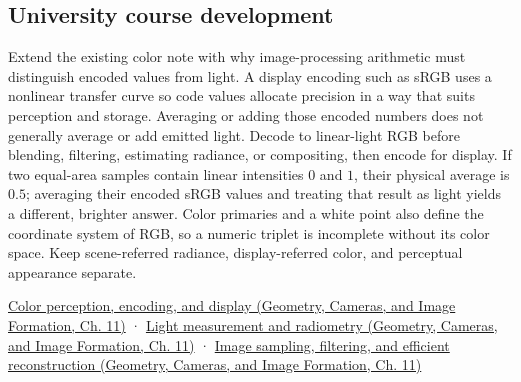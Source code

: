 \subsection{University course development}\label{appendix-a9f83ad40792-university-course-development}

\hypertarget{appendix-a9f83ad40792-university-course-development}{}

Extend the existing color note with why image-processing arithmetic must distinguish encoded values from light. A display encoding such as sRGB uses a nonlinear transfer curve so code values allocate precision in a way that suits perception and storage. Averaging or adding those encoded numbers does not generally average or add emitted light. Decode to linear-light RGB before blending, filtering, estimating radiance, or compositing, then encode for display. If two equal-area samples contain linear intensities \(0\) and \(1\), their physical average is \(0.5\); averaging their encoded sRGB values and treating that result as light yields a different, brighter answer. Color primaries and a white point also define the coordinate system of RGB, so a numeric triplet is incomplete without its color space. Keep scene-referred radiance, display-referred color, and perceptual appearance separate.

\href{../03-Geometry-Cameras-and-Image-Formation/main.pdf\#nameddest=03-visual-computing-i-ch004-color-perception-encoding-and-display}{Color perception, encoding, and display (Geometry, Cameras, and Image Formation, Ch. 11)} · \href{../03-Geometry-Cameras-and-Image-Formation/main.pdf\#nameddest=03-visual-computing-i-ch004-light-measurement-and-radiometry}{Light measurement and radiometry (Geometry, Cameras, and Image Formation, Ch. 11)} · \href{../03-Geometry-Cameras-and-Image-Formation/main.pdf\#nameddest=03-visual-computing-i-ch004-image-sampling-filtering-and-efficient-reconstruction}{Image sampling, filtering, and efficient reconstruction (Geometry, Cameras, and Image Formation, Ch. 11)}
